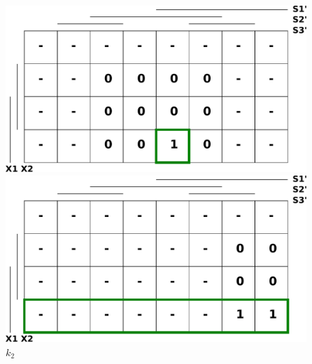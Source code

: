 \documentclass[titlepage]{article}
\begin{document}
\begin{center}
\begin{figure}[ht!]
\begin{minipage}[b]{0.45\linewidth}
\includegraphics[width=\textwidth]{karnaugh_j2.pdf}
	\caption{$j_2$}
\end{minipage}
\begin{minipage}[b]{0.45\linewidth}
\includegraphics[width=\textwidth]{karnaugh_k2.pdf}
	\caption{$k_2$}
\end{minipage}
\end{figure}


\end{center}
\end{document}

